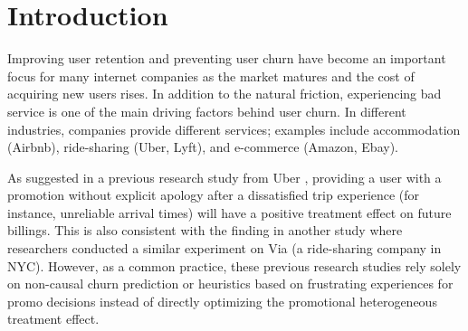 \section{Introduction}

Improving user retention and preventing user churn have become an important focus for many internet companies as the market matures and the cost of acquiring new users rises. In addition to the natural friction, experiencing bad service is one of the main driving factors behind user churn. In different industries, companies provide different services; examples include accommodation (Airbnb), ride-sharing (Uber, Lyft), and e-commerce (Amazon, Ebay).

As suggested in a previous research study from Uber \cite{halperin2018toward}, providing a user with a promotion without explicit apology after a dissatisfied trip experience (for instance, unreliable arrival times) will have a positive treatment effect on future billings. This is also consistent with the finding in another study \cite{cohen2018frustration} where researchers conducted a similar experiment on Via (a ride-sharing company in NYC). However, as a common practice, these previous research studies rely solely on non-causal churn prediction or heuristics based on frustrating experiences for promo decisions instead of directly optimizing the promotional heterogeneous treatment effect.

